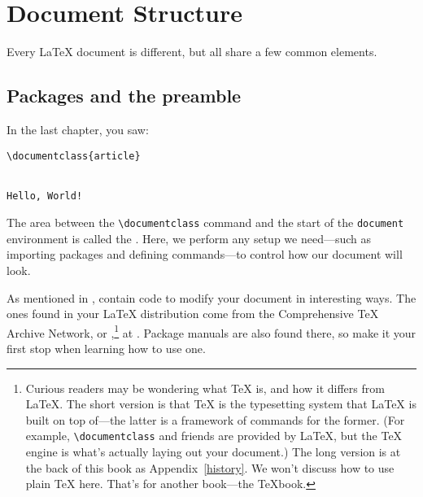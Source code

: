 \chapter{Document Structure}
\label{structure}

Every \LaTeX{} document is different,
but all share a few common elements.

\section{Packages and the preamble}
In the last chapter, you saw:
\begin{leftfigure}
\begin{lstlisting}
\documentclass{article}


Hello, World!

\end{lstlisting}
\end{leftfigure}
The area between the \verb|\documentclass| command and the start of the
\texttt{document} environment is called the .
Here, we perform any setup we need---such as importing packages
and defining commands---to control how our document
will look.

As mentioned in ,
 contain code to modify your document in interesting ways.
The ones found in your \LaTeX{} distribution come from the Comprehensive \TeX{}
Archive Network, or ,\punckern\footnote{Curious readers may
be wondering what \TeX{} is, and how it differs from \LaTeX.
The short version is that \TeX{} is the typesetting system that \LaTeX{}
is built on top of---the latter is a framework of commands for the former.
(For example, \texttt{\textbackslash documentclass} and friends are provided by
\LaTeX{}, but the \TeX{} engine is what's actually laying out your document.)
The long version is at the back of this book as Appendix~\ref{history}.
We won't discuss how to use plain \TeX{} here. That's for another book---the
\TeX book.}
at .
Package manuals are also found there,
so make it your first stop when learning how to use one.

